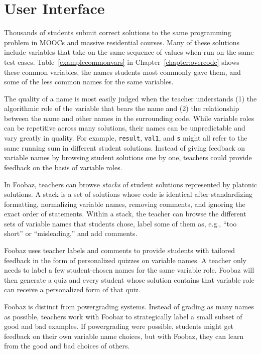 
\section{User Interface}

Thousands of students submit correct solutions to the same programming problem in MOOCs and massive residential courses. Many of these solutions include variables that take on the same sequence of values when run on the same test cases. Table~\ref{examplecommonvars} in Chapter~\ref{chapter:overcode} shows these common variables, the names students most commonly gave them, and some of the less common names for the same variables.

The quality of a name is most easily judged when the teacher understands (1) the algorithmic role of the variable that bears the name and (2) the relationship between the name and other names in the surrounding code. While variable roles can be repetitive across many solutions, their names can be unpredictable and vary greatly in quality. For example, \texttt{result}, \texttt{val1}, and \texttt{s} might all refer to the same running sum in different student solutions. Instead of giving feedback on variable names by browsing student solutions one by one, teachers could provide feedback on the basis of variable roles.

In Foobaz, teachers can browse \emph{stacks} of student solutions represented by platonic solutions. A stack is a set of solutions whose code is identical after standardizing formatting, normalizing variable names, removing comments, and ignoring the exact order of statements. Within a stack, the teacher can browse the different sets of variable names that students chose, label some of them as, e.g., ``too short'' or ``misleading,'' and add comments. 

Foobaz uses teacher labels and comments to provide students with tailored feedback in the form of personalized quizzes on variable names. A teacher only needs to label a few student-chosen names for the same variable role. Foobaz will then generate a quiz and every student whose solution contains that variable role can receive a personalized form of that quiz. %

Foobaz is distinct from powergrading systems. Instead of grading as many names as possible, teachers work with Foobaz to strategically label a small subset of good and bad examples. If powergrading were possible, students might get feedback on their own variable name choices, but with Foobaz, they can learn from the good and bad choices of others.


